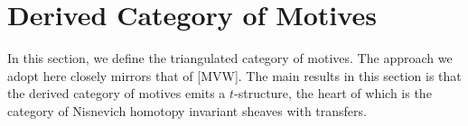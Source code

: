 \section{Derived Category of Motives}

In this section, we define the triangulated category of motives.
The approach we adopt here closely mirrors that of [MVW]. The main
results in this section is that the derived category of motives
emits a $t$-structure, the heart of which is the category of Nisnevich 
homotopy invariant sheaves with transfers.
